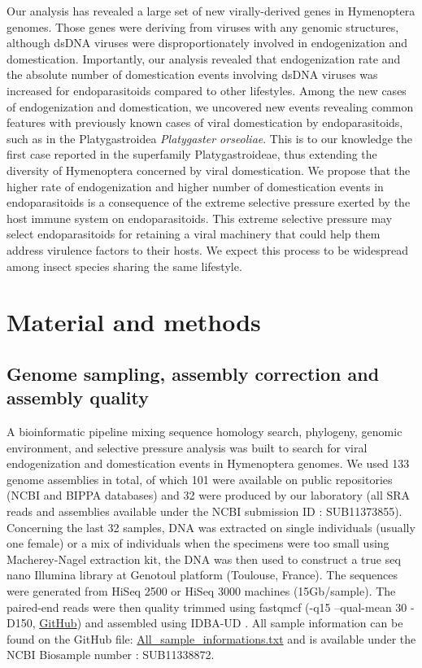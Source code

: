 Our analysis has revealed a large set of new virally-derived genes in Hymenoptera genomes. Those genes were deriving from viruses with any genomic structures, although dsDNA viruses were disproportionately involved in endogenization and domestication. 
Importantly, our analysis revealed that endogenization rate and the absolute number of domestication events involving dsDNA viruses was increased for endoparasitoids compared to other lifestyles. 
Among the new cases of endogenization and domestication, we uncovered new events revealing common features with previously known cases of viral domestication by endoparasitoids, such as in the Platygastroidea \textit{Platygaster orseoliae}. This is to our knowledge the first case reported in the superfamily Platygastroideae, thus extending the diversity of Hymenoptera concerned by viral domestication. We propose that the higher rate of endogenization and higher number of domestication events in endoparasitoids is a consequence of the extreme selective pressure exerted by the host immune system on endoparasitoids. This extreme selective pressure may select endoparasitoids for retaining a viral machinery that could help them address virulence factors to their hosts. We expect this process to be widespread among insect species sharing the same lifestyle.

\section{Material and methods}


\subsection{Genome sampling, assembly correction and assembly quality}
\label{sec:MM-1}

A bioinformatic pipeline mixing sequence homology search, phylogeny, genomic environment, and selective pressure analysis was built to search for viral endogenization and domestication events in Hymenoptera genomes. We used 133 genome assemblies in total, of which 101 were available on public repositories (NCBI and BIPPA databases) and 32 were produced by our laboratory (all SRA reads and assemblies available under the NCBI submission ID : SUB11373855). Concerning the last 32 samples, DNA was extracted on single individuals (usually one female) or a mix of individuals when the specimens were too small using Macherey-Nagel extraction kit, the DNA was then used to construct a true seq nano Illumina library at Genotoul platform (Toulouse, France). The sequences were generated from HiSeq 2500 or HiSeq 3000 machines (15Gb/sample). The paired-end reads were then quality trimmed using fastqmcf (-q15 --qual-mean 30 -D150, \href{https://GitHub.com/ExpressionAnalysis/ea-utils}{GitHub}) and assembled using IDBA-UD \citep{peng_idba-ud_2012}. All sample information can be found on the GitHub file: \href{https://github.com/BenjaminGuinet/PhD_defense/blob/main/Supplementary_paper1/All_sample_informations.txt}{All\_sample\_informations.txt} and is available under the NCBI Biosample number : SUB11338872.

